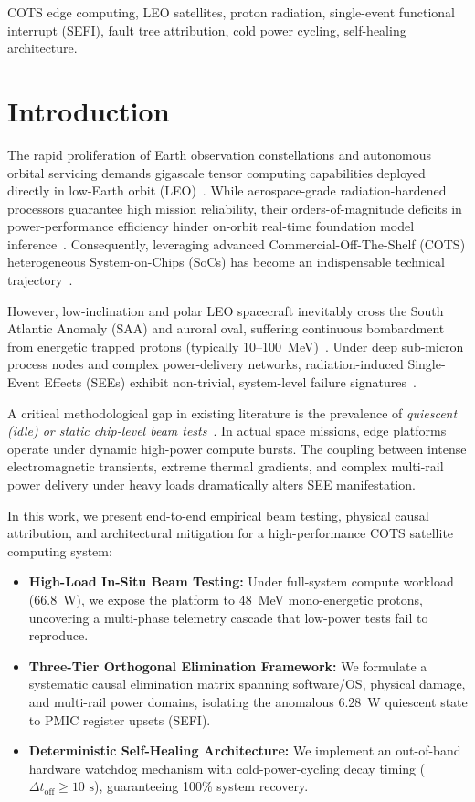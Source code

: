 \documentclass[conference]{IEEEtran}
\begin{document}
\begin{IEEEkeywords}
COTS edge computing, LEO satellites, proton radiation, single-event functional interrupt (SEFI), fault tree attribution, cold power cycling, self-healing architecture.
\end{IEEEkeywords}

\section{Introduction}
The rapid proliferation of Earth observation constellations and autonomous orbital servicing demands gigascale tensor computing capabilities deployed directly in low-Earth orbit (LEO)~\cite{ref1,ref2}. While aerospace-grade radiation-hardened processors guarantee high mission reliability, their orders-of-magnitude deficits in power-performance efficiency hinder on-orbit real-time foundation model inference~\cite{ref3,ref4}. Consequently, leveraging advanced Commercial-Off-The-Shelf (COTS) heterogeneous System-on-Chips (SoCs) has become an indispensable technical trajectory~\cite{ref5,ref6}.

However, low-inclination and polar LEO spacecraft inevitably cross the South Atlantic Anomaly (SAA) and auroral oval, suffering continuous bombardment from energetic trapped protons (typically 10--100~MeV)~\cite{ref7,ref8}. Under deep sub-micron process nodes and complex power-delivery networks, radiation-induced Single-Event Effects (SEEs) exhibit non-trivial, system-level failure signatures~\cite{ref9,ref10}.

A critical methodological gap in existing literature is the prevalence of \emph{quiescent (idle) or static chip-level beam tests}~\cite{ref11}. In actual space missions, edge platforms operate under dynamic high-power compute bursts. The coupling between intense electromagnetic transients, extreme thermal gradients, and complex multi-rail power delivery under heavy loads dramatically alters SEE manifestation.

In this work, we present end-to-end empirical beam testing, physical causal attribution, and architectural mitigation for a high-performance COTS satellite computing system:
\begin{itemize}
    \item \textbf{High-Load In-Situ Beam Testing:} Under full-system compute workload (66.8~W), we expose the platform to 48~MeV mono-energetic protons, uncovering a multi-phase telemetry cascade that low-power tests fail to reproduce.
    \item \textbf{Three-Tier Orthogonal Elimination Framework:} We formulate a systematic causal elimination matrix spanning software/OS, physical damage, and multi-rail power domains, isolating the anomalous 6.28~W quiescent state to PMIC register upsets (SEFI).
    \item \textbf{Deterministic Self-Healing Architecture:} We implement an out-of-band hardware watchdog mechanism with cold-power-cycling decay timing ($\Delta t_{\text{off}} \ge 10\text{ s}$), guaranteeing 100\% system recovery.
\end{itemize}
\end{document}
